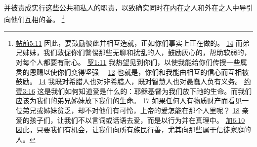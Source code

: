 \documentclass[12pt, a4paper, oneside]{ctexart}
\begin{document}
	并被责成实行这些公共和私人的职责，以致确实同时在内在之人和外在之人中导引向他们互相的善。
	\footnote {
		\href{https://biblehub.com/1_thessalonians/5-11.htm}{帖前5:11} 因此，要鼓励彼此并相互造就，正如你们事实上正在做的。 
		\href{https://biblehub.com/1_thessalonians/5-14.htm}{14} 而弟兄姊妹，我们敦促你们警惕那些无聊和扰乱的人，鼓励灰心的，帮助软弱的，对每个人都要有耐心。
		\href{https://biblehub.com/romans/1-11.htm}{罗1:11} 我热望见到你们，以使我能给你们传授一些属灵的恩赐以使你们变得坚强---
		\href{https://biblehub.com/romans/1-12.htm}{12} 也就是，你们和我能由相互的信心而互相被鼓励。
		\href{https://biblehub.com/romans/1-14.htm}{14} 我既对希腊人也对非希腊人，既对智慧人也对愚蠢人负有义务。
		\href{https://biblehub.com/1_john/3-16.htm}{约壹3:16} 这是我们如何知道爱是什么的：耶稣基督为我们放下祂的生命。而我们应该为我们的弟兄姊妹放下我们的生命。
		\href{https://biblehub.com/1_john/3-17.htm}{17} 如果任何人有物质财产而看见一位弟兄或姊妹贫乏，却不对他们有可怜，上帝的爱怎能在那个人里呢？
		\href{https://biblehub.com/1_john/3-18.htm}{18} 亲爱的孩子们，让我们不以言词或话语去爱，而是以行为并在真理中。
		\href{https://biblehub.com/galatians/6-10.htm}{加6:10} 因此，只要我们有机会，让我们向所有族民行善，尤其向那些属于信徒家庭的人。
	}
\end{document}
